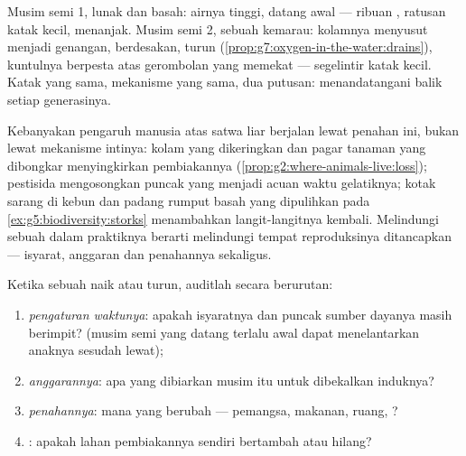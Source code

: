 \begin{example}\label{ex:g8:reproduction-and-environment:twosprings}
Musim semi 1, lunak dan basah: airnya tinggi,  datang awal
--- ribuan , ratusan katak kecil,  menanjak. Musim
semi 2, sebuah kemarau: kolamnya menyusut menjadi genangan, 
berdesakan,  turun
(\cref{prop:g7:oxygen-in-the-water:drains}), kuntulnya berpesta atas
gerombolan yang memekat --- segelintir katak kecil. Katak yang sama,
mekanisme yang sama, dua putusan:  menandatangani balik
setiap generasinya.
\end{example}

\begin{remark}\label{rem:g8:reproduction-and-environment:humans}
Kebanyakan pengaruh manusia atas satwa liar berjalan lewat penahan
ini, bukan lewat mekanisme intinya: kolam yang dikeringkan dan pagar
tanaman yang dibongkar menyingkirkan  pembiakannya
(\cref{prop:g2:where-animals-live:loss}); pestisida mengosongkan
puncak  yang menjadi acuan waktu gelatiknya; kotak sarang di kebun
dan padang rumput basah yang dipulihkan pada
\cref{ex:g5:biodiversity:storks} menambahkan langit-langitnya kembali.
Melindungi sebuah  dalam praktiknya berarti melindungi
 tempat reproduksinya ditancapkan --- isyarat, anggaran dan
penahannya sekaligus.
\end{remark}

\begin{method}\label{met:g8:reproduction-and-environment:audit}
Ketika sebuah  naik atau turun, auditlah secara berurutan:
\begin{enumerate}
  \item \emph{pengaturan waktunya}: apakah isyaratnya dan puncak
        sumber dayanya masih berimpit? (musim semi yang datang terlalu
        awal dapat menelantarkan anaknya sesudah  lewat);
  \item \emph{anggarannya}: apa yang dibiarkan  musim itu untuk
        dibekalkan induknya?
  \item \emph{penahannya}: mana yang berubah --- pemangsa, makanan,
        ruang, ?
  \item \emph{}: apakah lahan pembiakannya sendiri bertambah
        atau hilang?
\end{enumerate}
\end{method}

